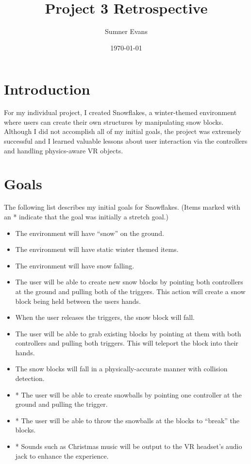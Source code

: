 \documentclass[11pt]{article}
\title{Project 3 Retrospective}
\author{Sumner Evans}
\date{\today}
\begin{document}
\maketitle

\section{Introduction}
For my individual project, I created Snowflakes, a winter-themed environment
where users can create their own structures by manipulating snow blocks.
Although I did not accomplish all of my initial goals, the project was extremely
successful and I learned valuable lessons about user interaction via the
controllers and handling physics-aware VR objects.

\section{Goals}
The following list describes my initial goals for Snowflakes. (Items marked with
an * indicate that the goal was initially a stretch goal.)
\begin{itemize}
    \item The environment will have ``snow'' on the ground.
    \item The environment will have static winter themed items.
    \item The environment will have snow falling.
    \item The user will be able to create new snow blocks by pointing both
        controllers at the ground and pulling both of the triggers. This action
        will create a snow block being held between the users hands.
    \item When the user releases the triggers, the snow block will fall.
    \item The user will be able to grab existing blocks by pointing at them with
        both controllers and pulling both triggers. This will teleport the block
        into their hands.
    \item The snow blocks will fall in a physically-accurate manner with
        collision detection.
    \item * The user will be able to create snowballs by pointing one
        controller at the ground and pulling the trigger.
    \item * The user will be able to throw the snowballs at the blocks to
        ``break'' the blocks.
    \item * Sounds such as Christmas music will be output to the VR headset's
        audio jack to enhance the experience.
\end{itemize}
\end{document}
